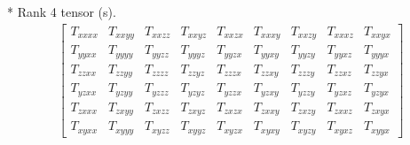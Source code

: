 \documentclass[fleqn,8pt,landscape]{jsarticle}
\begin{document}
* Rank 4 tensor (s).
\begin{align*}
\begin{bmatrix} T_{xxxx} & T_{xxyy} & T_{xxzz} & T_{xxyz} & T_{xxzx} & T_{xxxy} & T_{xxzy} & T_{xxxz} & T_{xxyx} \\ T_{yyxx} & T_{yyyy} & T_{yyzz} & T_{yyyz} & T_{yyzx} & T_{yyxy} & T_{yyzy} & T_{yyxz} & T_{yyyx} \\ T_{zzxx} & T_{zzyy} & T_{zzzz} & T_{zzyz} & T_{zzzx} & T_{zzxy} & T_{zzzy} & T_{zzxz} & T_{zzyx} \\ T_{yzxx} & T_{yzyy} & T_{yzzz} & T_{yzyz} & T_{yzzx} & T_{yzxy} & T_{yzzy} & T_{yzxz} & T_{yzyx} \\ T_{zxxx} & T_{zxyy} & T_{zxzz} & T_{zxyz} & T_{zxzx} & T_{zxxy} & T_{zxzy} & T_{zxxz} & T_{zxyx} \\ T_{xyxx} & T_{xyyy} & T_{xyzz} & T_{xyyz} & T_{xyzx} & T_{xyxy} & T_{xyzy} & T_{xyxz} & T_{xyyx} \end{bmatrix}
\end{align*}
\end{document}
